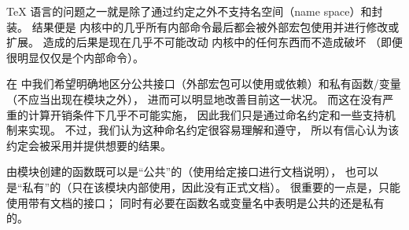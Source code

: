 \documentclass[full]{l3doc}
\begin{document}
\TeX{} 语言的问题之一就是除了通过约定之外不支持名空间（name space）和封装。
结果便是 \LaTeXe{} 内核中的几乎所有内部命令最后都会被外部宏包使用并进行修改或扩展。
造成的后果是现在几乎不可能改动 \LaTeXe{} 内核中的任何东西而不造成破坏
（即便很明显仅仅是个内部命令）。


在  中我们希望明确地区分公共接口（外部宏包可以使用或依赖）和私有函数/变量（不应当出现在模块之外），
进而可以明显地改善目前这一状况。
而这在没有严重的计算开销条件下几乎不可能实施，
因此我们只是通过命名约定和一些支持机制来实现。
不过，我们认为这种命名约定很容易理解和遵守，
所以有信心认为该约定会被采用并提供想要的结果。

%
%

由模块创建的函数既可以是“公共”的（使用给定接口进行文档说明），
也可以是“私有”的（只在该模块内部使用，因此没有正式文档）。
很重要的一点是，只能使用带有文档的接口；
同时有必要在函数名或变量名中表明是公共的还是私有的。

\end{document}
